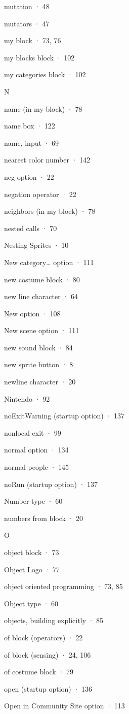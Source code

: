 \documentclass[
  letterpaper,
]{book}
\begin{document}
mutation · 48

mutators · 47

my block · 73, 76

my blocks block · 102

my categories block · 102

N

name (in my block) · 78

name box · 122

name, input · 69

nearest color number · 142

neg option · 22

negation operator · 22

neighbors (in my block) · 78

nested calls · 70

Nesting Sprites · 10

New category\ldots{} option · 111

new costume block · 80

new line character · 64

New option · 108

New scene option · 111

new sound block · 84

new sprite button · 8

newline character · 20

Nintendo · 92

noExitWarning (startup option) · 137

nonlocal exit · 99

normal option · 134

normal people · 145

noRun (startup option) · 137

Number type · 60

numbers from block · 20

O

object block · 73

Object Logo · 77

object oriented programming · 73, 85

Object type · 60

objects, building explicitly · 85

of block (operators) · 22

of block (sensing) · 24, 106

of costume block · 79

open (startup option) · 136

Open in Community Site option · 113
\end{document}
